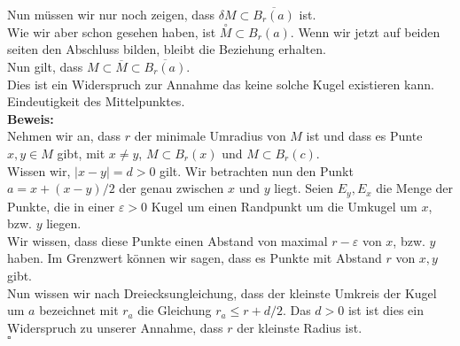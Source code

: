 \documentclass[11pt,a4paper,ngerman]{article}
\begin{document}
\begin{enumerate}[(i)]
                Nun müssen wir nur noch zeigen, dass $\delta M \subset \overline{B_{r}(a)}$ ist.\\
                Wie wir aber schon gesehen haben, ist $\overset{\circ}{M} \subset B_{r}(a)$.
                Wenn wir jetzt auf beiden seiten den Abschluss bilden, bleibt die Beziehung erhalten.\\
                Nun gilt, dass $M \subset \overline{M} \subset \overline{B_{r}(a)}$.\\

                Dies ist ein Widerspruch zur Annahme das keine solche Kugel existieren kann.\\

            Eindeutigkeit des Mittelpunktes.\\
            \textbf{Beweis:}\\
                Nehmen wir an, dass $r$ der minimale Umradius von $M$ ist
                und dass es Punte $x,y \in M$ gibt, mit $x \not= y$, $M \subset B_r(x)$
                und $M \subset B_r(c)$.\\

                Wissen wir, $|x - y | = d > 0$ gilt. Wir betrachten nun den Punkt
                $a = x + (x - y)/2$ der genau zwischen $x$ und $y$ liegt. Seien $E_y,E_x$ die
                Menge der Punkte, die in einer $\varepsilon >0$ Kugel um einen Randpunkt 
                um die Umkugel um $x$, bzw. $y$ liegen.\\
                Wir wissen, dass diese Punkte einen Abstand von maximal $r-\varepsilon$ von $x$, bzw. $y$
                haben. Im Grenzwert können wir sagen, dass es Punkte mit Abstand $r$ von $x,y$ gibt.\\

                Nun wissen wir nach Dreiecksungleichung, dass der kleinste Umkreis der Kugel um $a$
                bezeichnet mit $r_a$ die Gleichung $r_a \leq r + d/2$. Das $d>0$ ist
                ist dies ein Widerspruch zu unserer Annahme, dass $r$ der kleinste Radius ist.\\
            \mbox{} \hfill $\square$


\end{enumerate}
\end{document}
